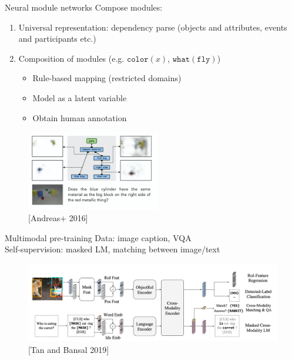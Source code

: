 \documentclass[usenames,dvipsnames,notes]{beamer}
\begin{document}
\begin{frame}
    {Neural module networks}
    Compose modules:\\
    \begin{enumerate}
        \item Universal representation: dependency parse (objects and attributes, events and participants etc.)
        \item Composition of modules (e.g. $\texttt{color}(x)$, $\texttt{what}(\texttt{fly})$)
            \begin{itemize}
                \item Rule-based mapping (restricted domains) 
                \item Model as a latent variable
                \item Obtain human annotation
            \end{itemize}
    \end{enumerate}

    \vspace{-1em}
    \begin{figure}
        \includegraphics[height=3.5cm]{figures/nmn-ex3}
        \caption{[Andreas+ 2016]}
    \end{figure}
    \vspace{-1em}
\end{frame}

\begin{frame}
    {Multimodal pre-training}
    Data: image caption, VQA \\
    Self-supervision: masked LM, matching between image/text

    \vspace{-1em}
    \begin{figure}
        \includegraphics[height=3.5cm]{figures/lxmert}
        \caption{[Tan and Bansal 2019]}
    \end{figure}
\end{frame}
\end{document}
